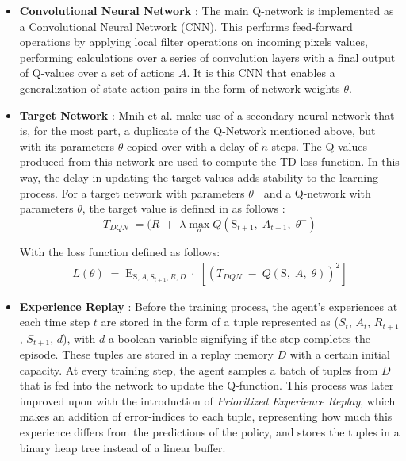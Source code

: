 \documentclass[10pt,journal,compsoc]{IEEEtran}
\begin{document}
\begin{itemize}
\item \textbf{Convolutional Neural Network} : 
The main Q-network is implemented as a Convolutional Neural Network (CNN). This performs feed-forward operations by applying local filter operations on incoming pixels values, performing calculations over a series of convolution layers with a final output of Q-values over a set of actions \(A\). It is this CNN that enables a generalization of state-action pairs in the form of network weights \(\theta\).\linebreak

\item \textbf{Target Network} :
Mnih et al. make use of a secondary neural network that is, for the most part, a duplicate of the Q-Network mentioned above, but with its parameters \(\theta\) copied over with a delay of $n$ steps. The Q-values produced from this network are used to compute the TD loss function. In this way, the delay in updating the target values adds stability to the learning process. For a target network with parameters \(\theta ^{-}\) and a Q-network with parameters \(\theta\), the target value is defined in \cite{deepqlearning} as follows :
\begin{equation}
T_{DQN}\; = ( R\; +\; \lambda \max _{a}Q\left( \mbox{S}_{t+1},\; A_{t+1},\; \theta ^{-} \right)
\end{equation}

With the loss function defined as follows:
\begin{equation}
\begin{split}
L\left( \theta  \right)\; =\; \mbox{E}_{\mbox{S},A,\mbox{S}_{t+1},R,D}\; \cdot \; \left[ \left(T_{DQN}\; -\; Q\left( \mbox{S},\; A,\; \theta  \right) \right)^{2}\right]
\end{split}
\end{equation}

\item \textbf{Experience Replay} : Before the training process, the agent's experiences at each time step $t$ are stored in the form of a tuple represented as (\({{S}}_{{t}}\), \({{A}}_{{t}}\), \({{R}}_{{t+1}}\), \({{S}}_{{t+1}}\), \(d\)), with \(d\) a boolean variable signifying if the step completes the episode. These tuples are stored in a replay memory \(D\) with a certain initial capacity. At every training step, the agent samples a batch of tuples from \(D\) that is fed into the network to update the Q-function. This process was later improved upon with the introduction of \textit{Prioritized Experience Replay}\cite{per}, which makes an addition of error-indices to each tuple, representing how much this experience differs from the predictions of the policy, and stores the tuples in a binary heap tree instead of a linear buffer.
\end{itemize}
\end{document}

